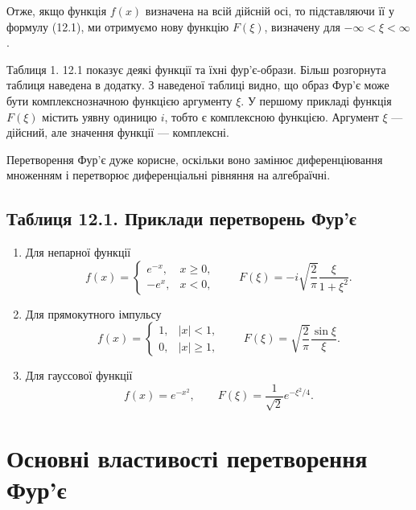 \documentclass[
  ukrainian,
]{article}
\begin{document}
Отже, якщо функція \(f(x)\) визначена на всій дійсній осі, то
підставляючи її у формулу (12.1), ми отримуємо нову функцію \(F(\xi)\),
визначену для \(-\infty < \xi < \infty\).

Таблиця 1. 12.1 показує деякі функції та їхні фур'є-образи. Більш
розгорнута таблиця наведена в додатку. З наведеної таблиці видно, що
образ Фур'є може бути комплекснозначною функцією аргументу \(\xi\). У
першому прикладі функція \(F(\xi)\) містить уявну одиницю \(i\), тобто є
комплексною функцією. Аргумент \(\xi\) --- дійсний, але значення функції
--- комплексні.

Перетворення Фур'є дуже корисне, оскільки воно замінює диференціювання
множенням і перетворює диференціальні рівняння на алгебраїчні.

\subsection{Таблиця 12.1. Приклади перетворень
Фур'є}\label{ux442ux430ux431ux43bux438ux446ux44f-12.1.-ux43fux440ux438ux43aux43bux430ux434ux438-ux43fux435ux440ux435ux442ux432ux43eux440ux435ux43dux44c-ux444ux443ux440ux454}

\begin{enumerate}
\def\labelenumi{\arabic{enumi}.}
\item
  Для непарної функції\\
  \[
  f(x)=
  \begin{cases}
  e^{-x}, & x\ge 0,\\
  -e^{x}, & x<0,
  \end{cases}
  \qquad
  F(\xi)=-i\sqrt{\frac{2}{\pi}}\frac{\xi}{1+\xi^2}.
  \]
\item
  Для прямокутного імпульсу\\
  \[
  f(x)=
  \begin{cases}
  1, & |x|<1,\\
  0, & |x|\ge 1,
  \end{cases}
  \qquad
  F(\xi)=\sqrt{\frac{2}{\pi}}\frac{\sin\xi}{\xi}.
  \]
\item
  Для гауссової функції\\
  \[
  f(x)=e^{-x^2},
  \qquad
  F(\xi)=\frac{1}{\sqrt{2}}e^{-\xi^2/4}.
  \]
\end{enumerate}

\section{Основні властивості перетворення
Фур'є}\label{ux43eux441ux43dux43eux432ux43dux456-ux432ux43bux430ux441ux442ux438ux432ux43eux441ux442ux456-ux43fux435ux440ux435ux442ux432ux43eux440ux435ux43dux43dux44f-ux444ux443ux440ux454}
\end{document}
